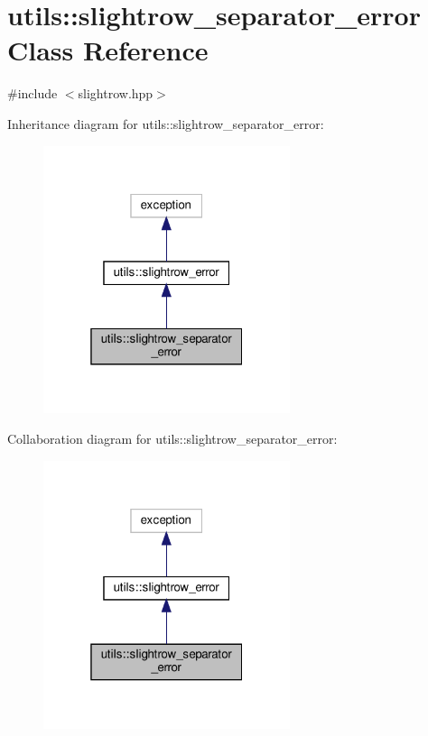 \hypertarget{classutils_1_1slightrow__separator__error}{}\section{utils\+:\+:slightrow\+\_\+separator\+\_\+error Class Reference}
\label{classutils_1_1slightrow__separator__error}


{\ttfamily \#include $<$slightrow.\+hpp$>$}



Inheritance diagram for utils\+:\+:slightrow\+\_\+separator\+\_\+error\+:
\nopagebreak
\begin{figure}[H]
\begin{center}
\leavevmode
\includegraphics[width=205pt]{classutils_1_1slightrow__separator__error__inherit__graph}
\end{center}
\end{figure}


Collaboration diagram for utils\+:\+:slightrow\+\_\+separator\+\_\+error\+:
\nopagebreak
\begin{figure}[H]
\begin{center}
\leavevmode
\includegraphics[width=205pt]{classutils_1_1slightrow__separator__error__coll__graph}
\end{center}
\end{figure}


